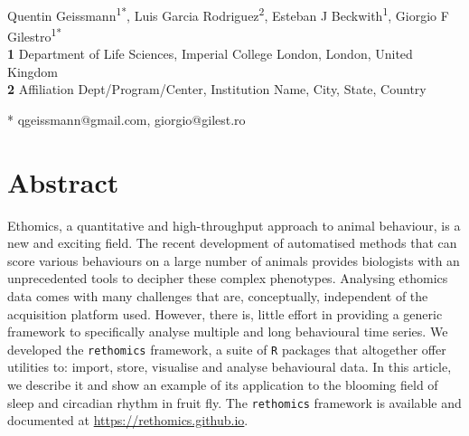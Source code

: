 \documentclass[10pt,letterpaper]{article}
\date{}
\begin{document}
\vspace*{0.2in}

\begin{flushleft}
{\Large
\textbf{} 
}
\newline
\\
Quentin Geissmann\textsuperscript{1*},
Luis Garcia Rodriguez\textsuperscript{2},
Esteban J Beckwith\textsuperscript{1},
Giorgio F Gilestro\textsuperscript{1*}
\\
\bigskip
\textbf{1} Department of Life Sciences, Imperial College London, London, United Kingdom
\\
\textbf{2} Affiliation Dept/Program/Center, Institution Name, City, State, Country %
\\
\bigskip


* qgeissmann@gmail.com, giorgio@gilest.ro

\end{flushleft}
\section*{Abstract}
Ethomics, a quantitative and high-throughput approach to animal behaviour, is a new and exciting field.
The recent development of automatised methods that can score various behaviours on a large number of animals
provides biologists with an unprecedented tools to decipher these complex phenotypes. 
Analysing ethomics data comes with many challenges that are, conceptually, independent of the acquisition platform used.
However, there is, little effort in providing a generic framework to specifically analyse multiple and long behavioural time series.
We developed the \texttt{rethomics} framework, a suite of \texttt{R} packages that altogether offer utilities to:
import, store, visualise and analyse behavioural data.
In this article, we describe it and show an example of its application to the blooming field of sleep and circadian rhythm in fruit fly.
The \texttt{rethomics} framework is available and documented at \href{https://rethomics.github.io}{https://rethomics.github.io}.
\end{document}
